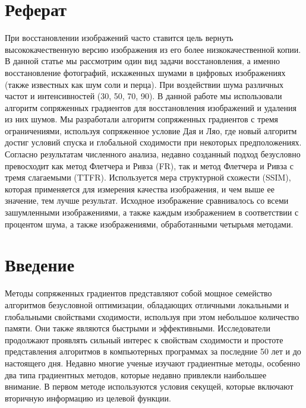 



\makeatletter
\newcommand{\stackover}{\genfrac{.}{.}\z@{}}
\makeatother




\tableofcontents
\newpage

\section*{Реферат}

При восстановлении изображений часто ставится цель вернуть высококачественную
версию изображения из его более низкокачественной копии. В данной статье мы
рассмотрим один вид задачи восстановления, а именно восстановление фотографий,
искаженных шумами в цифровых изображениях (также известных как шум соли и
перца). При воздействии шума различных частот и интенсивностей (30, 50, 70, 90).
В данной работе мы использовали алгоритм сопряженных градиентов для
восстановления изображений и удаления из них шумов. Мы разработали алгоритм
сопряженных градиентов с тремя ограничениями, используя сопряженное условие Дая
и Ляо, где новый алгоритм достиг условий спуска и глобальной сходимости при
некоторых предположениях. Согласно результатам численного анализа, недавно
созданный подход безусловно превосходит как метод Флетчера и Ривза (FR), так и
метод Флетчера и Ривза с тремя слагаемыми (TTFR). Используется мера структурной
схожести (SSIM), которая применяется для измерения качества изображения, и чем
выше ее значение, тем лучше результат. Исходное изображение сравнивалось со
всеми зашумленными изображениями, а также каждым изображением в соответствии с
процентом шума, а также изображениями, обработанными четырьмя методами.

\section{Введение}

Методы сопряженных градиентов представляют собой мощное семейство алгоритмов
безусловной оптимизации, обладающих отличными локальными и глобальными
свойствами сходимости, используя при этом небольшое количество памяти. Они также
являются быстрыми и эффективными. Исследователи продолжают проявлять сильный
интерес к свойствам сходимости и простоте представления алгоритмов в
компьютерных программах за последние 50 лет и до настоящего дня. Недавно многие
ученые изучают градиентные методы, особенно два типа градиентных методов,
которые недавно привлекли наибольшее внимание. В первом методе используются
условия секущей, которые включают вторичную информацию из целевой функции.

